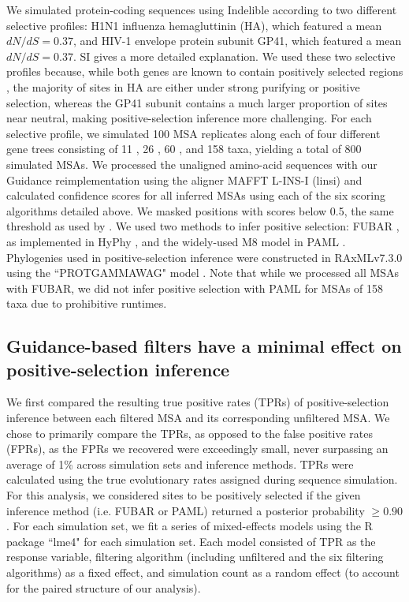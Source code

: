 \documentclass[11pt]{article}
\begin{document}
We simulated protein-coding sequences using Indelible \citep{Fletcher2009} according to two different selective profiles: H1N1 influenza hemagluttinin (HA), which featured a mean $dN/dS = 0.37$, and HIV-1 envelope protein subunit GP41, which featured a mean $dN/dS = 0.37$. SI gives a more detailed explanation. We used these two selective profiles because, while both genes are known to contain positively selected regions \citep{Bush1999, Frost2001, Bandawe2008, Meyer2012}, the majority of sites in HA are either under strong purifying or positive selection, whereas the GP41 subunit contains a much larger proportion of sites near neutral, making positive-selection inference more challenging. For each selective profile, we simulated 100 MSA replicates along each of four different gene trees consisting of 11 \citep{Spielman2013}, 26 \citep{Spielman2013}, 60 \citep{Yang2011}, and 158 \citep{Betancur2013} taxa, yielding a total of 800 simulated MSAs. We processed the unaligned amino-acid sequences with our Guidance reimplementation using the aligner MAFFT L-INS-I (linsi) \citep{Katoh2002,Katoh2005} and calculated confidence scores for all inferred MSAs using each of the six scoring algorithms detailed above. We masked positions with scores below 0.5, the same threshold as used by \citet{Jordan2012}. We used two methods to infer positive selection: FUBAR \citep{Murrell2013}, as implemented in HyPhy \citep{Pond2005}, and the widely-used M8 model in PAML \citep{Yang2000, Yang2007}. Phylogenies used in positive-selection inference were constructed in RAxMLv7.3.0 using the ``PROTGAMMAWAG" model \citep{Stamatakis2006}.  Note that while we processed all MSAs with FUBAR, we did not infer positive selection with PAML for MSAs of 158 taxa due to prohibitive runtimes.

\subsection*{Guidance-based filters have a minimal effect on positive-selection inference}

We first compared the resulting true positive rates (TPRs) of positive-selection inference between each filtered MSA and its corresponding unfiltered MSA. We chose to primarily compare the TPRs, as opposed to the false positive rates (FPRs), as the FPRs we recovered were exceedingly small, never surpassing an average of 1\% across simulation sets and inference methods. TPRs were calculated using the true evolutionary rates assigned during sequence simulation. For this analysis, we considered sites to be positively selected if the given inference method (i.e. FUBAR or PAML) returned a posterior probability $\geq0.90$. For each simulation set, we fit a series of mixed-effects models using the R package ``lme4" \citep{Bates2012} for each simulation set. Each model consisted of TPR as the response variable, filtering algorithm (including unfiltered and the six filtering algorithms) as a fixed effect, and simulation count as a random effect (to account for the paired structure of our analysis). 
\end{document}
